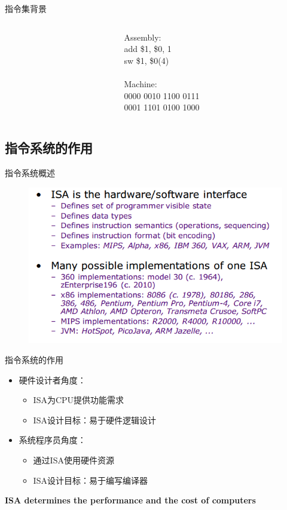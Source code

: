 \documentclass{myslide}
\begin{document}
\begin{frame}[fragile]{指令集背景}
{\begin{columns}
\begin{column}{0.65\linewidth}
\begin{center}
\end{center}
\end{column}
\begin{column}{0.35\linewidth}
Assembly:\\
add \$1, \$0, 1 \\
sw \$1, \$0(4) \\
\quad\\
Machine:\\
0000 0010 1100 0111 \\
0001 1101 0100 1000
\end{column}
\end{columns}
}
\end{frame}

\subsection{指令系统的作用}
\begin{frame}{指令系统概述}
\begin{figure}
\centering
\includegraphics[width=0.9\linewidth]{fig/Lecture2/overview.PNG}
\end{figure}
\end{frame}

\begin{frame}{指令系统的作用}
\begin{itemize}
	\item 硬件设计者角度：
	\begin{itemize}
		\item ISA为CPU提供功能需求
		\item ISA设计目标：易于硬件逻辑设计
	\end{itemize}
	\item 系统程序员角度：
	\begin{itemize}
		\item 通过ISA使用硬件资源
		\item ISA设计目标：易于编写编译器
	\end{itemize}
\end{itemize}
\begin{center}
\textbf{ISA determines the performance and the cost of computers}
\end{center}
\end{frame}
\end{document}
